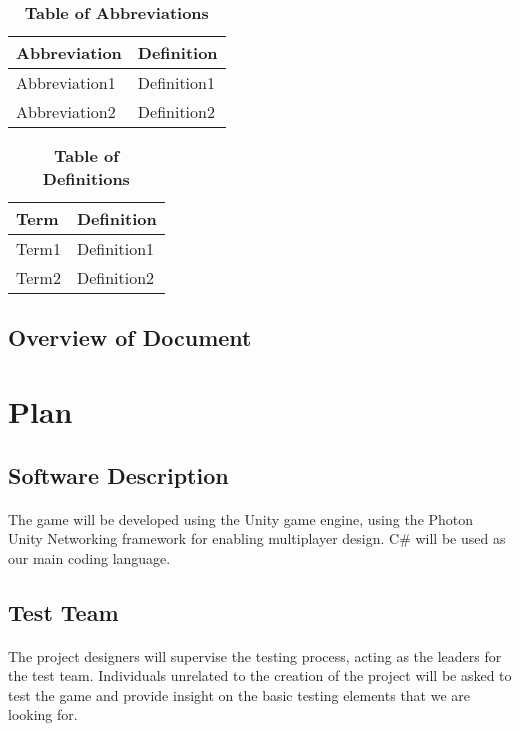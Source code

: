 \documentclass[12pt, titlepage]{article}
\begin{document}
\begin{table}[hbp]
\caption{\textbf{Table of Abbreviations}} \label{Table}
\begin{tabularx}{\textwidth}{p{3cm}X}
\toprule
\textbf{Abbreviation} & \textbf{Definition} \\
\midrule
Abbreviation1 & Definition1\\
Abbreviation2 & Definition2\\
\bottomrule
\end{tabularx}
\end{table}
\begin{table}[!htbp]
\caption{\textbf{Table of Definitions}} \label{Table}
\begin{tabularx}{\textwidth}{p{3cm}X}
\toprule
\textbf{Term} & \textbf{Definition}\\
\midrule
Term1 & Definition1\\
Term2 & Definition2\\
\bottomrule
\end{tabularx}
\end{table}	
\subsection{Overview of Document}
\section{Plan}
	
\subsection{Software Description}
\paragraph{}The game will be developed using the Unity game engine, using the Photon Unity Networking framework for enabling multiplayer design. C# will be used as our main coding language.
\subsection{Test Team}
\paragraph{}The project designers will supervise the testing process, acting as the leaders for the test team. Individuals unrelated to the creation of the project will be asked to test the game and provide insight on the basic testing elements that we are looking for. 
\end{document}

